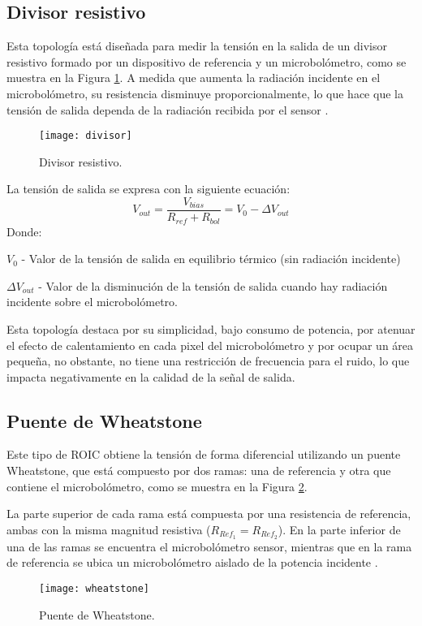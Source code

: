 \subsection{Divisor resistivo} 
Esta topología está diseñada para medir la tensión en la salida de un divisor resistivo formado por un dispositivo de referencia y un microbolómetro, como se muestra en la Figura \ref{fig:divisor}. A medida que aumenta la radiación incidente en el microbolómetro, su resistencia disminuye proporcionalmente, lo que hace que la tensión de salida dependa de la radiación recibida por el sensor \cite{BlancoMDA}.
            \begin{figure}[hbtp]
                \centering
                \texttt{[image: divisor]}
                \caption{Divisor resistivo.}
                \label{fig:divisor}
            \end{figure}

La tensión de salida se expresa con la siguiente ecuación:
        \begin{equation}
        V_{out} =\frac{V_{bias}}{R_{ref} + R_{bol}} = V_{0} - \Delta V_{out}
        \label{eq:Divisor}
        \end{equation} 
Donde:


$V_{0}$ - Valor de la tensión de salida en equilibrio térmico (sin radiación incidente)


$\Delta V_{out}$ - Valor de la disminución de la tensión de salida cuando hay radiación incidente sobre el microbolómetro.


Esta topología destaca por su simplicidad, bajo consumo de potencia, por atenuar el efecto de calentamiento en cada pixel del microbolómetro y por ocupar un área pequeña, no obstante, no tiene una restricción de frecuencia para el ruido, lo que impacta negativamente en la calidad de la señal de salida.

\subsection{Puente de Wheatstone}
Este tipo de ROIC obtiene la tensión de forma diferencial utilizando un puente Wheatstone, que está compuesto por dos ramas: una de referencia y otra que contiene el microbolómetro, como se muestra en la Figura \ref{fig:wheatstone}.

La parte superior de cada rama está compuesta por una resistencia de referencia, ambas con la misma magnitud resistiva ($R_{Ref_1} = R_{Ref_2}$). En la parte inferior de una de las ramas se encuentra el microbolómetro sensor, mientras que en la rama de referencia se ubica un microbolómetro aislado de la potencia incidente \cite{BlancoMDA}.
            \begin{figure}[hbtp]
                \centering
                \texttt{[image: wheatstone]}
                \caption{Puente de Wheatstone.}
                \label{fig:wheatstone}
            \end{figure}

